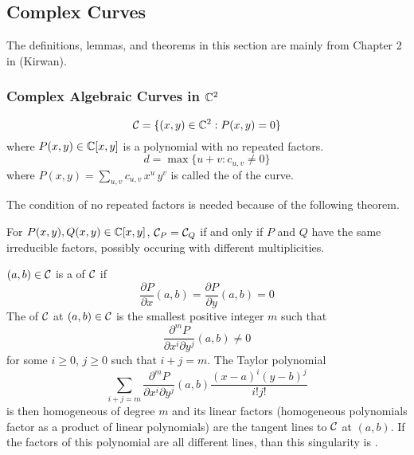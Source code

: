 \subsection{Complex Curves}

The definitions, lemmas, and theorems in this section are mainly from Chapter 2 in \cite{ref:kirwan} (Kirwan).

\subsubsection{Complex Algebraic Curves in $\mathbb C^2$}

\begin{definition}
    $$\mathcal C=\{(x,y)\in\mathbb C^2:P(x,y)=0\}$$
    where $P(x,y)\in\mathbb C[x,y]$ is a polynomial with no repeated factors.
    $$d=\max\{u+v:c_{u,v}\neq 0\}$$ where $\displaystyle P(x,y)=\sum_{u,v}c_{u,v}\,x^u\,y^v$ is called the  of the curve.
\end{definition}

The condition of no repeated factors is needed because of the following theorem.

\begin{factx}
    For $P(x,y),Q(x,y)\in\mathbb C[x,y]$, $\mathcal C_P=\mathcal C_Q$ if and only if $P$ and $Q$ have the same irreducible factors, possibly occuring with different multiplicities.
\end{factx}

\begin{definition}
    $(a,b)\in\mathcal C$ is a  of $\mathcal C$ if $$\frac{\partial P}{\partial x}(a,b)=\frac{\partial P}{\partial y}(a,b)=0$$
    The  of $\mathcal C$ at $(a,b)\in\mathcal C$ is the smallest positive integer $m$ such that $$\frac{\partial^mP}{\partial x^i\partial y^j}(a,b)\neq 0$$ for some $i\geq 0$, $j\geq 0$ such that $i+j=m$. The Taylor polynomial $$\sum_{i+j=m}\frac{\partial^mP}{\partial x^i\partial y^j}(a,b)\frac{(x-a)^i(y-b)^j}{i!j!}$$ is then homogeneous of degree $m$ and its linear factors (homogeneous polynomials factor as a product of linear polynomials) are the tangent lines to $\mathcal C$ at $(a,b)$. If the factors of this polynomial are all different lines, than this singularity is .
\end{definition}

